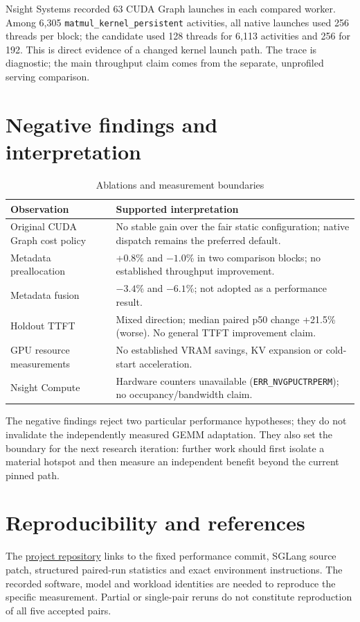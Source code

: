 \documentclass[11pt,a4paper]{article}
\begin{document}
Nsight Systems recorded 63 CUDA Graph launches in each compared worker. Among 6,305 \texttt{matmul\_kernel\_persistent} activities, all native launches used 256 threads per block; the candidate used 128 threads for 6,113 activities and 256 for 192. This is direct evidence of a changed kernel launch path. The trace is diagnostic; the main throughput claim comes from the separate, unprofiled serving comparison.

\clearpage\section{Negative findings and interpretation}
\begin{table}[H]\centering\small
\caption{Ablations and measurement boundaries}\begin{tabularx}{\textwidth}{@{}p{}X@{}}\toprule
Observation & Supported interpretation \\\midrule
Original CUDA Graph cost policy & No stable gain over the fair static configuration; native dispatch remains the preferred default. \\
Metadata preallocation & +0.8\% and $-1.0$\% in two comparison blocks; no established throughput improvement. \\
Metadata fusion & $-3.4$\% and $-6.1$\%; not adopted as a performance result. \\
Holdout TTFT & Mixed direction; median paired p50 change +21.5\% (worse). No general TTFT improvement claim. \\
GPU resource measurements & No established VRAM savings, KV expansion or cold-start acceleration. \\
Nsight Compute & Hardware counters unavailable (\texttt{ERR\_NVGPUCTRPERM}); no occupancy/bandwidth claim. \\
\bottomrule\end{tabularx}\end{table}
The negative findings reject two particular performance hypotheses; they do not invalidate the independently measured GEMM adaptation. They also set the boundary for the next research iteration: further work should first isolate a material hotspot and then measure an independent benefit beyond the current pinned path.

\section{Reproducibility and references}
The \href{https://github.com/yu830/graph-budget-runtime}{project repository} links to the fixed performance commit, SGLang source patch, structured paired-run statistics and exact environment instructions. The recorded software, model and workload identities are needed to reproduce the specific measurement. Partial or single-pair reruns do not constitute reproduction of all five accepted pairs.
\end{document}
